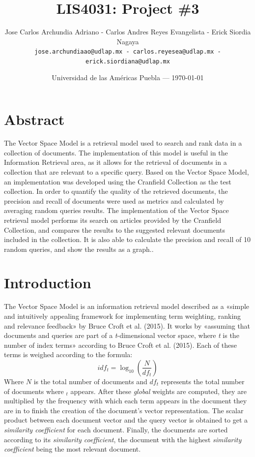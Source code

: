 \documentclass{article}
\title{LIS4031: Project \#3} %
\author{Jose Carlos Archundia Adriano - Carlos Andres Reyes Evangelista - Erick Siordia Nagaya\\ \texttt{jose.archundiaao@udlap.mx - carlos.reyesea@udlap.mx - erick.siordiana@udlap.mx}} %
\date{Universidad de las Am\'ericas  Puebla --- \today} %
\begin{document}
\maketitle %

\section{Abstract}
The Vector Space Model is a retrieval model used to search and rank data in a collection of documents. The implementation of this model is useful in the Information Retrieval area, as it allows for the retrieval of documents in a collection that are relevant to a specific query. Based on the Vector Space Model, an implementation was developed using the Cranfield Collection as the test collection. In order to quantify the quality of the retrieved documents, the precision and recall of documents were used as metrics and calculated by averaging random queries results.
The implementation of the Vector Space retrieval model performs its search on articles provided by the Cranfield Collection, and compares the results to the suggested relevant documents included in the collection. It is also able to calculate the precision and recall of 10 random queries, and show the results as a graph..


\section{Introduction}
The Vector Space Model is an information retrieval model described as a «simple and intuitively appealing framework for implementing term weighting, ranking and relevance feedback» by Bruce Croft et al. (2015). It works by «assuming that documents and queries are part of a \textit{t}-dimensional vector space, where \textit{t} is the number of index terms» according to Bruce Croft et al. (2015). Each of these terms is weighed according to the formula:
\begin{equation}
	idf_{t}=\log_{10}(\frac{N}{df_{t}})
\end{equation}
Where $N$ is the total number of documents and $df_{t}$ represents the total number of documents where $_{t}$ appears. After these \textit{global} weights are computed, they are multiplied by the frequency with which each term appears in the document they are in to finish the creation of the document's vector representation. The scalar product between each document vector and the query vector is obtained to get a \textit{similarity coefficient} for each document. Finally, the documents are sorted according to its \textit{similarity coefficient}, the document with the highest \textit{similarity coefficient} being the most relevant document.
\end{document}
